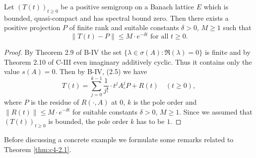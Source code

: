 \begin{theorem}\label{thm:c4-2.1}
%
%
%
Let $(T(t))_{t \geq 0}$ be a positive semigroup on a Banach lattice $E$ which is bounded, quasi-compact and has spectral bound zero.
Then there exists a positive projection $P$ of finite rank and suitable constants $\delta > 0$, $M \geq 1$ such that
\begin{equation}\label{eq:c4-2.1}
\|T(t) - P\| \leq M \cdot e^{-\delta t} \text{ for all } t \geq 0.
\end{equation}
\end{theorem}
\begin{proof}
By Theorem 2.9 of B-IV the set $\{\lambda \in \sigma(A) \colon \Re(\lambda) = 0\}$ is finite and by Theorem 2.10 of C-III even imaginary additively cyclic.
Thus it contains only the value $s(A) = 0$.
Then by B-IV, (2.5) we have
\begin{equation*}\label{eq:c4-2.1-kgk}
T(t) = \sum_{j=0}^{k-1} \frac{1}{j!} \cdot t^{j}A^{j}_{\circ}P + R(t) \quad (t \geq 0),
\end{equation*}
where $P$ is the residue of $R(\cdot,A)$ at $0$, $k$ is the pole order and $\|R(t)\| \leq M \cdot e^{-\delta t}$ for suitable constants $\delta > 0$, $M \geq 1$.
Since we assumed that $(T(t))_{t \geq 0}$ is bounded, the pole order $k$ has to be $1$.
\end{proof}
Before discussing a concrete example we formulate some remarks related to Theorem \ref{thm:c4-2.1}.
